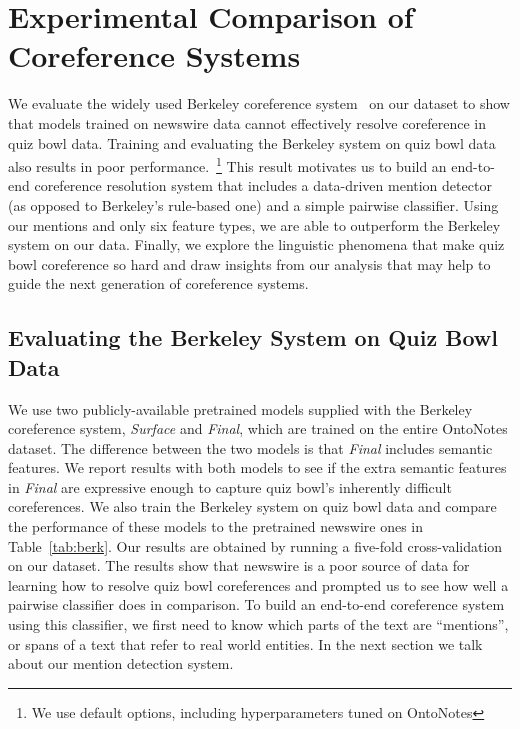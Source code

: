 \section{Experimental Comparison of Coreference Systems}
\label{sec:system}

We evaluate the widely used Berkeley coreference system~\cite{DurrettKlein2013}
on our dataset to show that models trained on newswire data cannot effectively
resolve coreference in quiz bowl data. Training and evaluating the Berkeley
system on quiz bowl data also results in poor performance.~\footnote{We use
  default options, including hyperparameters tuned on OntoNotes} This result
motivates us to build an end-to-end coreference resolution system that includes
a data-driven mention detector (as opposed to Berkeley's rule-based one) and a
simple pairwise classifier. Using our mentions and only six feature types, we
are able to outperform the Berkeley system on our data. Finally, we explore the
linguistic phenomena that make quiz bowl coreference so hard and draw insights
from our analysis that may help to guide the next generation of coreference
systems.

\subsection{Evaluating the Berkeley System on Quiz Bowl Data}

We use two publicly-available pretrained models supplied with the Berkeley
coreference system, \emph{Surface} and \emph{Final}, which are trained on the
entire OntoNotes dataset. The difference between the two models is that
\emph{Final} includes semantic features. We report results with both models to
see if the extra semantic features in \emph{Final} are expressive enough to
capture quiz bowl's inherently difficult coreferences. We also train the
Berkeley system on quiz bowl data and compare the performance of these models to
the pretrained newswire ones in Table~\ref{tab:berk}. Our results are obtained
by running a five-fold cross-validation on our dataset. The results show that
newswire is a poor source of data for learning how to resolve quiz bowl
coreferences and prompted us to see how well a pairwise classifier does in
comparison. To build an end-to-end coreference system using this classifier, we
first need to know which parts of the text are ``mentions'', or spans of a text
that refer to real world entities. In the next section we talk about our mention
detection system.

